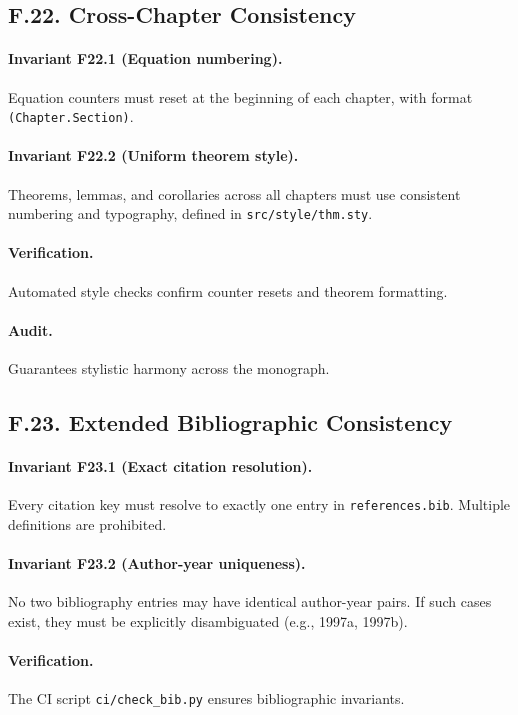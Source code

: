 \subsection*{F.22. Cross-Chapter Consistency}

\paragraph{Invariant F22.1 (Equation numbering).} Equation counters must reset at the beginning of each chapter, with format \texttt{(Chapter.Section)}.

\paragraph{Invariant F22.2 (Uniform theorem style).} Theorems, lemmas, and corollaries across all chapters must use consistent numbering and typography, defined in \texttt{src/style/thm.sty}.

\paragraph{Verification.} Automated style checks confirm counter resets and theorem formatting.

\paragraph{Audit.} Guarantees stylistic harmony across the monograph.

\subsection*{F.23. Extended Bibliographic Consistency}

\paragraph{Invariant F23.1 (Exact citation resolution).} Every citation key must resolve to exactly one entry in \texttt{references.bib}. Multiple definitions are prohibited.

\paragraph{Invariant F23.2 (Author-year uniqueness).} No two bibliography entries may have identical author-year pairs. If such cases exist, they must be explicitly disambiguated (e.g., 1997a, 1997b).

\paragraph{Verification.} The CI script \texttt{ci/check\_bib.py} ensures bibliographic invariants.

